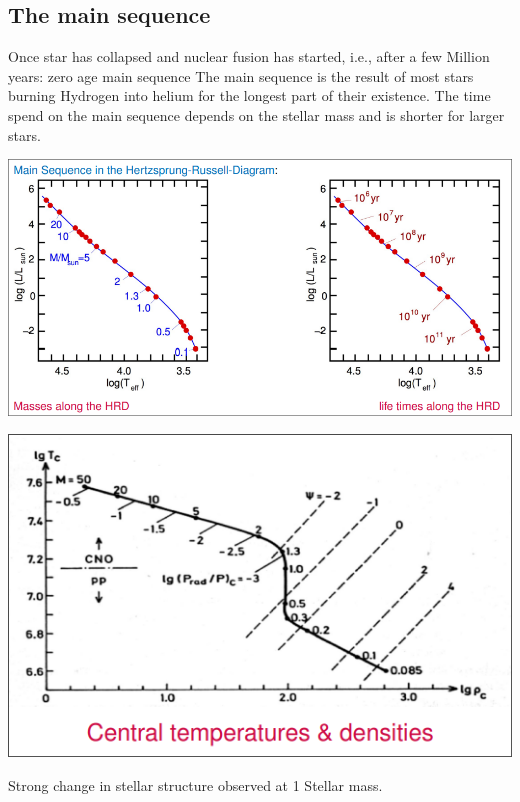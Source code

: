 \documentclass[11pt,a4paper]{article}
\begin{document}
\subsection{The main sequence}
Once star has collapsed and nuclear fusion has started, i.e., after a few Million years: zero age main sequence
The main sequence is the result of most stars burning Hydrogen into helium for the longest part of their existence.
The time spend on the main sequence depends on the stellar mass and is shorter for larger stars.
\begin{center}
    \includegraphics[width=0.5\linewidth]{screenshot_2024-01-23-115246.png}
\end{center}
\begin{center}
    \includegraphics[width=0.5\linewidth]{screenshot_2024-01-23-115334.png}
\end{center}
Strong change in stellar structure observed at 1 Stellar mass. 
\end{document}
